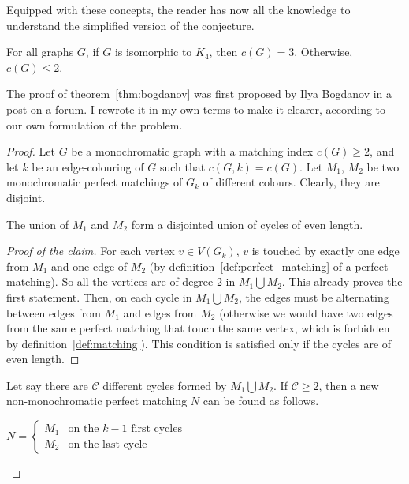 Equipped with these concepts, the reader has now all the knowledge to understand the simplified version of the conjecture.

\begin{theorem}
    \label{thm:bogdanov}
    For all graphs $G$, if $G$ is isomorphic to $K_4$, then $c(G) = 3$.
    Otherwise, $c(G) \leq 2$.
\end{theorem}

The proof of theorem~\ref{thm:bogdanov} was first proposed by Ilya Bogdanov in a post on a forum. \cite{bogdanov}
I rewrote it in my own terms to make it clearer, according to our own formulation of the problem.

\begin{proof}
    Let $G$ be a monochromatic graph with a matching index $c(G) \geq 2$, and let $k$ be an edge-colouring of $G$ such that $c(G, k) = c(G)$.
    Let $M_1$, $M_2$ be two monochromatic perfect matchings of $G_k$ of different colours.
    Clearly, they are disjoint.
    
    \begin{claim}
        \label{clm:even_cycles}
        The union of $M_1$ and $M_2$ form a disjointed union of cycles of even length.
    \end{claim}
    
    \begin{proof}[Proof of the claim]
        For each vertex $v \in V(G_k)$, $v$ is touched by exactly one edge from $M_1$ and one edge of $M_2$ (by definition~\ref{def:perfect_matching} of a perfect matching).
        So all the vertices are of degree 2 in $M_1 \bigcup M_2$.
        This already proves the first statement.
        Then, on each cycle in $M_1 \bigcup M_2$, the edges must be alternating between edges from $M_1$ and edges from $M_2$ (otherwise we would have two edges from the same perfect matching that touch the same vertex, which is forbidden by definition~\ref{def:matching}).
        This condition is satisfied only if the cycles are of even length.
    \end{proof}
    
    Let say there are $\mathcal{C}$ different cycles formed by $M_1 \bigcup M_2$.
    If $\mathcal{C} \geq 2$, then a new non-monochromatic perfect matching $N$ can be found as follows.
    
    \begin{center}
        $N = \left\{
        \begin{array}{ll}
            M_1 & \mbox{on the } k - 1 \mbox{ first cycles} \\
            M_2 & \mbox{on the last cycle}
        \end{array}
        \right.$
    \end{center}


\end{proof}
